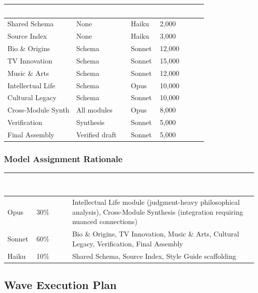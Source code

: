\documentclass[11pt,letterpaper]{article}
\newcommand{\tableheader}[1]{\textbf{\sffamily\textcolor{white}{#1}}}
\begin{document}
\begin{center}
\begin{tabularx}{\textwidth}{L{3cm}L{2cm}C{1.5cm}C{2cm}}
\toprule
{}
\tableheader{Component} & \tableheader{Dependencies} & \tableheader{Model} & \tableheader{Est. Tokens} \\
\midrule
Shared Schema & None & Haiku & 2,000 \\
Source Index & None & Haiku & 3,000 \\
Bio \& Origins & Schema & Sonnet & 12,000 \\
TV Innovation & Schema & Sonnet & 15,000 \\
Music \& Arts & Schema & Sonnet & 12,000 \\
Intellectual Life & Schema & Opus & 10,000 \\
Cultural Legacy & Schema & Sonnet & 10,000 \\
Cross-Module Synth & All modules & Opus & 8,000 \\
Verification & Synthesis & Sonnet & 5,000 \\
Final Assembly & Verified draft & Sonnet & 5,000 \\
\bottomrule
\end{tabularx}
\end{center}

\subsubsection{Model Assignment Rationale}

\begin{center}
\begin{tabularx}{\textwidth}{C{1.5cm}C{1.5cm}X}
\toprule
{}
\tableheader{Model} & \tableheader{\% Budget} & \tableheader{Assigned To} \\
\midrule
Opus & 30\% & Intellectual Life module (judgment-heavy philosophical analysis), Cross-Module Synthesis (integration requiring nuanced connections) \\
Sonnet & 60\% & Bio \& Origins, TV Innovation, Music \& Arts, Cultural Legacy, Verification, Final Assembly \\
Haiku & 10\% & Shared Schema, Source Index, Style Guide scaffolding \\
\bottomrule
\end{tabularx}
\end{center}

\subsection{Wave Execution Plan}
\end{document}

